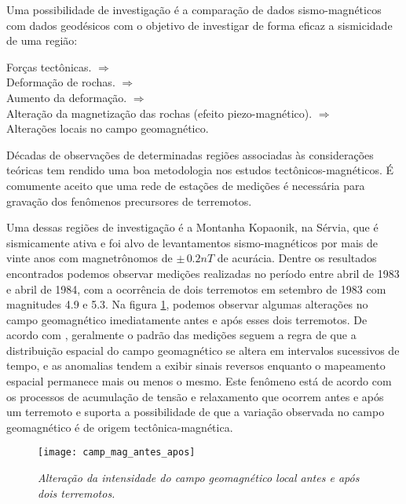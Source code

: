 Uma possibilidade de investiga\c{c}\~ao \'e a compara\c{c}\~ao de dados sismo-magn\'eticos com dados geod\'esicos com o objetivo de investigar de forma eficaz a sismicidade de uma regi\~ao:
\begin{center}
For\c{c}as tect\^onicas. $\Rightarrow$\\
Deforma\c{c}\~ao de rochas. $\Rightarrow$\\
Aumento da deforma\c{c}\~ao. $\Rightarrow$\\
Altera\c{c}\~ao da magnetiza\c{c}\~ao das rochas (efeito piezo-magn\'etico). $\Rightarrow$\\
Altera\c{c}\~oes locais no campo geomagn\'etico.
\end{center}
D\'ecadas de observa\c{c}\~oes de determinadas regi\~oes associadas \`as considera\c{c}\~oes te\'oricas tem rendido uma boa metodologia nos estudos tect\^onicos-magn\'eticos. \'E comumente aceito que uma rede de esta\c{c}\~oes de medi\c{c}\~oes \'e necess\'aria para grava\c{c}\~ao dos fen\^omenos precursores de terremotos.

Uma dessas regi\~oes de investiga\c{c}\~ao \'e a Montanha Kopaonik, na S\'ervia, que \'e sismicamente ativa e foi alvo de levantamentos sismo-magn\'eticos por mais de vinte anos com magnetr\^onomos de $\pm\,0.2 nT$ de acur\'acia. Dentre os resultados encontrados podemos observar medi\c{c}\~oes realizadas no per\'iodo entre abril de 1983 e abril de 1984, com a ocorr\^encia de dois terremotos em setembro de 1983 com magnitudes 4.9 e 5.3. Na figura \ref{fig.camp_mag_ant_apo}, podemos observar algumas altera\c{c}\~oes no campo geomagn\'etico imediatamente antes e ap\'os esses dois terremotos. De acordo com \cite{Rikitake_80}, geralmente o padr\~ao das medi\c{c}\~oes seguem a regra de que a distribui\c{c}\~ao espacial do campo geomagn\'etico se altera em intervalos sucessivos de tempo, e as anomalias tendem a exibir sinais reversos enquanto o mapeamento espacial permanece mais ou menos o mesmo. Este fen\^omeno est\'a de acordo com os processos de acumula\c{c}\~ao de tens\~ao e relaxamento que ocorrem antes e ap\'os um terremoto e suporta a possibilidade de que a varia\c{c}\~ao observada no campo geomagn\'etico \'e de origem tect\^onica-magn\'etica.
\begin{figure}
\centering
\texttt{[image: camp\_mag\_antes\_apos]}
\caption{\textit{Altera\c{c}\~ao da intensidade do campo geomagn\'etico local antes e ap\'os dois terremotos.}}
\label{fig.camp_mag_ant_apo}
\end{figure}











